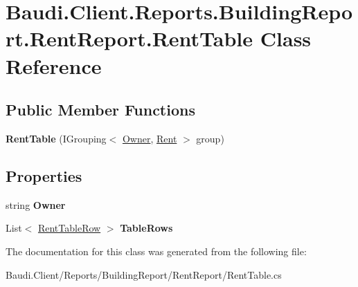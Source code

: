 \hypertarget{class_baudi_1_1_client_1_1_reports_1_1_building_report_1_1_rent_report_1_1_rent_table}{}\section{Baudi.\+Client.\+Reports.\+Building\+Report.\+Rent\+Report.\+Rent\+Table Class Reference}
\label{class_baudi_1_1_client_1_1_reports_1_1_building_report_1_1_rent_report_1_1_rent_table}
\subsection*{Public Member Functions}
\begin{DoxyCompactItemize}
\item 
\hypertarget{class_baudi_1_1_client_1_1_reports_1_1_building_report_1_1_rent_report_1_1_rent_table_a4e2bc300299995b8277d600433767de0}{}{\bfseries Rent\+Table} (I\+Grouping$<$ \hyperlink{class_baudi_1_1_d_a_l_1_1_models_1_1_owner}{Owner}, \hyperlink{class_baudi_1_1_d_a_l_1_1_models_1_1_rent}{Rent} $>$ group)\label{class_baudi_1_1_client_1_1_reports_1_1_building_report_1_1_rent_report_1_1_rent_table_a4e2bc300299995b8277d600433767de0}

\end{DoxyCompactItemize}
\subsection*{Properties}
\begin{DoxyCompactItemize}
\item 
\hypertarget{class_baudi_1_1_client_1_1_reports_1_1_building_report_1_1_rent_report_1_1_rent_table_aa12509dc1332d8d1d857ea79a64710e4}{}string {\bfseries Owner}\label{class_baudi_1_1_client_1_1_reports_1_1_building_report_1_1_rent_report_1_1_rent_table_aa12509dc1332d8d1d857ea79a64710e4}

\item 
\hypertarget{class_baudi_1_1_client_1_1_reports_1_1_building_report_1_1_rent_report_1_1_rent_table_a0cd0bc34d28995b95e4ad22ccd014929}{}List$<$ \hyperlink{class_baudi_1_1_client_1_1_reports_1_1_building_report_1_1_rent_report_1_1_rent_table_row}{Rent\+Table\+Row} $>$ {\bfseries Table\+Rows}\label{class_baudi_1_1_client_1_1_reports_1_1_building_report_1_1_rent_report_1_1_rent_table_a0cd0bc34d28995b95e4ad22ccd014929}

\end{DoxyCompactItemize}


The documentation for this class was generated from the following file\+:\begin{DoxyCompactItemize}
\item 
Baudi.\+Client/\+Reports/\+Building\+Report/\+Rent\+Report/Rent\+Table.\+cs\end{DoxyCompactItemize}
